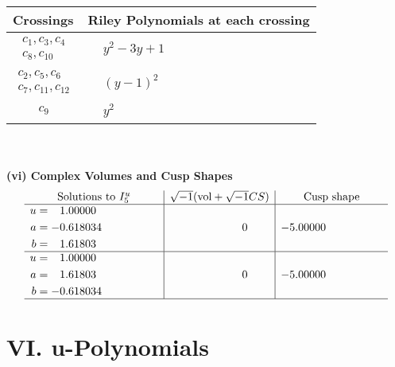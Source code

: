 \documentclass[1p]{elsarticle_modified}
\theoremstyle{definition}
\newcommand{\I}{\sqrt{-1}}
\begin{document}
\begin{tabular}{m{50pt}|m{274pt}}
Crossings & \hspace{64pt}Riley Polynomials at each crossing \\
\hline $$\begin{aligned}c_{1},c_{3},c_{4}\\c_{8},c_{10}\end{aligned}$$&$\begin{aligned}
&y^2-3 y+1
\end{aligned}$\\
\hline $$\begin{aligned}c_{2},c_{5},c_{6}\\c_{7},c_{11},c_{12}\end{aligned}$$&$\begin{aligned}
&(y-1)^2
\end{aligned}$\\
\hline $$\begin{aligned}c_{9}\end{aligned}$$&$\begin{aligned}
&y^2
\end{aligned}$\\
\hline
\end{tabular}\\~\\
\newpage\flushleft \textbf{(vi) Complex Volumes and Cusp Shapes}
$$\begin{array}{c|c|c}  
\text{Solutions to }I^u_{5}& \I (\text{vol} + \sqrt{-1}CS) & \text{Cusp shape}\\
 \hline 
\begin{aligned}
u &= \phantom{-}1.00000\phantom{ +0.000000I} \\
a &= -0.618034\phantom{ +0.000000I} \\
b &= \phantom{-}1.61803\phantom{ +0.000000I}\end{aligned}
 & \phantom{-0.000000 } 0 & -5.00000\phantom{ +0.000000I} \\ \hline\begin{aligned}
u &= \phantom{-}1.00000\phantom{ +0.000000I} \\
a &= \phantom{-}1.61803\phantom{ +0.000000I} \\
b &= -0.618034\phantom{ +0.000000I}\end{aligned}
 & \phantom{-0.000000 } 0 & -5.00000\phantom{ +0.000000I}\\
 \hline 
 \end{array}$$\newpage
\newpage\renewcommand{\arraystretch}{1}
\centering \section*{ VI. u-Polynomials}
\end{document}
